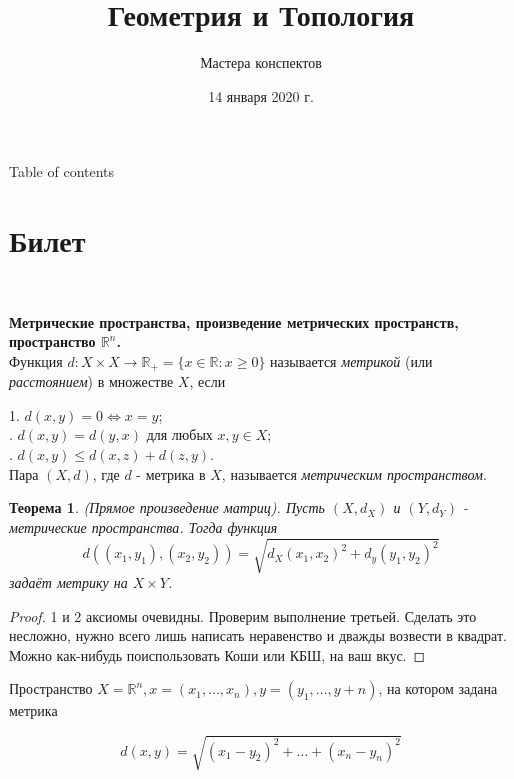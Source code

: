 \documentclass[a4paper,100pt]{article}
\title{Геометрия и Топология}
\author{Мастера конспектов}
\date{14 января 2020 г.}
\theoremstyle{indented}
\newtheorem{theorem}{Теорема}
\begin{document}
\maketitle 

\newpage

\hypertarget{t1}{Table of contents}
\tableofcontents

\newpage

\section{Билет} \

\medskip

\textbf{Метрические пространства, произведение метрических пространств, пространство $\mathbb{R}^n$.} \\

Функция $d: X \times X \rightarrow \mathbb{R}_+ = \{x \in \mathbb{R} : x\geq 0\}$ называется \hypertarget{n1}{\textit{метрикой}} (или \textit{расстоянием}) 
в множестве $X$, если \

\medskip

1. $d(x, y)=0 \Leftrightarrow x=y$; \\
. $d(x, y)= d(y, x)$ для любых $x, y \in X$; \\
. $d(x, y)\leq d(x, z)+d(z, y)$. \\

Пара $(X, d)$, где $d$ - метрика в $X$, называется \textit{метрическим пространством}. \\

\begin{theorem}
(Прямое произведение матриц). Пусть $(X, d_X)$ и $(Y, d_Y)$ - метрические пространства. Тогда функция
\[
    d((x_1, y_1), (x_2, y_2))=\sqrt{d_X(x_1, x_2)^2+d_y(y_1, y_2)^2}
\]
задаёт метрику на $X\times Y$.
\end{theorem}

\begin{proof}
1 и 2 аксиомы очевидны. Проверим выполнение третьей. Сделать это несложно, нужно всего лишь написать неравенство и дважды возвести в квадрат. Можно как-нибудь поиспользовать Коши или КБШ, на ваш вкус.
\end{proof}

\medskip

Пространство $X=\mathbb{R}^n, x=(x_1, \dots, x_n), y=(y_1, \dots, y+n)$, на котором задана метрика

\[
    d(x, y)=\sqrt{(x_1-y_2)^2+\dots+(x_n-y_n)^2}
\]
\end{document}
